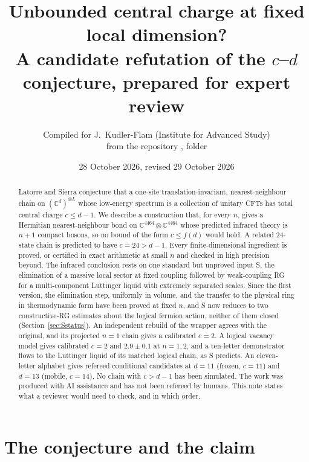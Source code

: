 \documentclass[11pt]{article}
\title{Unbounded central charge at fixed local dimension?\\
\large A candidate refutation of the $c$--$d$ conjecture, prepared for expert review}
\author{Compiled for J.~Kudler-Flam (Institute for Advanced Study)\\
\small from the repository \repo{github.com/jkudlerflam/cd-conjecture}, folder \repo{notes/cd_conjecture}}
\date{28 October 2026, revised 29 October 2026}
\theoremstyle{definition}
\newcommand{\C}{\mathbb{C}}
\begin{document}
\maketitle

\begin{abstract}
Latorre and Sierra conjecture that a one-site translation-invariant, nearest-neighbour chain on $(\C^d)^{\otimes L}$ whose low-energy spectrum is a collection of unitary CFTs has total central charge $c\le d-1$. We describe a construction that, for every $n$, gives a Hermitian nearest-neighbour bond on $\C^{4464}\otimes\C^{4464}$ whose predicted infrared theory is $n+1$ compact bosons, so no bound of the form $c\le f(d)$ would hold. A related 24-state chain is predicted to have $c=24>d-1$. Every finite-dimensional ingredient is proved, or certified in exact arithmetic at small $n$ and checked in high precision beyond. The infrared conclusion rests on one standard but unproved input S, the elimination of a massive local sector at fixed coupling followed by weak-coupling RG for a multi-component Luttinger liquid with extremely separated scales. Since the first version, the elimination step, uniformly in volume, and the transfer to the physical ring in thermodynamic form have been proved at fixed $n$, and S now reduces to two constructive-RG estimates about the logical fermion action, neither of them closed (Section~\ref{sec:Sstatus}). An independent rebuild of the wrapper agrees with the original, and its projected $n=1$ chain gives a calibrated $c=2$. A logical vacancy model gives calibrated $c=2$ and $2.9\pm0.1$ at $n=1,2$, and a ten-letter demonstrator flows to the Luttinger liquid of its matched logical chain, as S predicts. An eleven-letter alphabet gives refereed conditional candidates at $d=11$ (frozen, $c=11$) and $d=13$ (mobile, $c=14$). No chain with $c>d-1$ has been simulated. The work was produced with AI assistance and has not been refereed by humans. This note states what a reviewer would need to check, and in which order.
\end{abstract}

\section{The conjecture and the claim}
\end{document}

